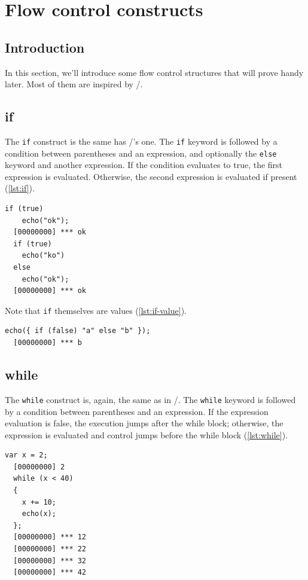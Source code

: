 \documentclass[openright,twoside,12pt]{report}
\newcommand{\lst}[1]{\autoref{lst:#1}}
\begin{document}
\chapter{Flow control constructs}

\section{Introduction}

In this section, we'll introduce some flow control structures that
will prove handy later. Most of them are inspired by \C/\Cxx.

\section{if}

The \texttt{if} construct is the same has \C/\Cxx's one. The
\texttt{if} keyword is followed by a condition between parentheses and
an expression, and optionally the \texttt{else} keyword and another
expression. If the condition evaluates to true, the first expression
is evaluated. Otherwise, the second expression is evaluated if
present (\lst{if}).

\begin{lstlisting}[caption=The \texttt{if} construct, label=lst:if]
  if (true)
    echo("ok");
  [00000000] *** ok
  if (true)
    echo("ko")
  else
    echo("ok");
  [00000000] *** ok
\end{lstlisting}

Note that \lstinline|if| themselves are values (\lst{if-value}).

\begin{lstlisting}[caption=\texttt{if} are values, label=lst:if-value]
  echo({ if (false) "a" else "b" });
  [00000000] *** b
\end{lstlisting}

\section{while}

The \texttt{while} construct is, again, the same as in \C/\Cxx. The
\texttt{while} keyword is followed by a condition between parentheses
and an expression. If the expression evaluation is false, the
execution jumps after the while block; otherwise, the expression is
evaluated and control jumps before the while block (\lst{while}).

\begin{lstlisting}[caption=The \texttt{while} construct,
  label=lst:while]
  var x = 2;
  [00000000] 2
  while (x < 40)
  {
    x += 10;
    echo(x);
  };
  [00000000] *** 12
  [00000000] *** 22
  [00000000] *** 32
  [00000000] *** 42
\end{lstlisting}
\end{document}

